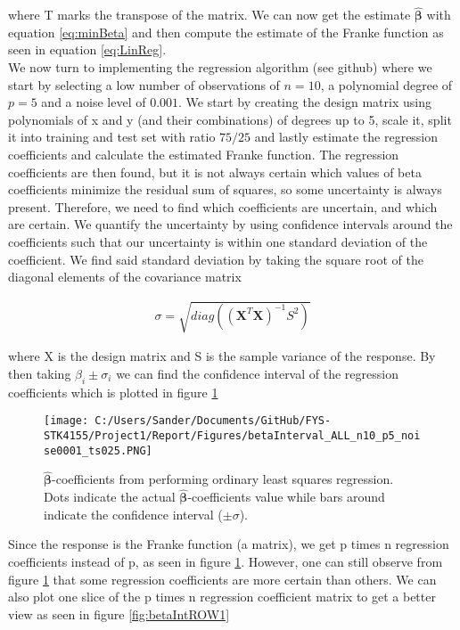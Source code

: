 \documentclass[12pt,a4paper]{article}
\begin{document}
\noindent where T marks the transpose of the matrix. We can now get the estimate $\hat{\boldsymbol{\beta}}$ with equation \ref{eq:minBeta} and then compute the estimate of the Franke function as seen in equation \ref{eq:LinReg}.
\\
We now turn to implementing the regression algorithm (see github) where we start by selecting a low number of observations of $n = 10$, a polynomial degree of $p = 5$ and a noise level of $0.001$. We start by creating the design matrix using polynomials of x and y (and their combinations) of degrees up to 5, scale it, split it into training and test set with ratio $75/25$ and lastly estimate the regression coefficients and calculate the estimated Franke function. The regression coefficients are then found, but it is not always certain which values of beta coefficients minimize the residual sum of squares, so some uncertainty is always present. Therefore, we need to find which coefficients are uncertain, and which are certain. We quantify the uncertainty by using confidence intervals around the coefficients such that our uncertainty is within one standard deviation of the coefficient. We find said standard deviation by taking the square root of the diagonal elements of the covariance matrix 

\begin{equation}\label{eq:diagCOV}
\begin{aligned}
\sigma = \sqrt{diag((\textbf{X}^T\textbf{X})^{-1}S^2)}
\end{aligned}
\end{equation}

\noindent where X is the design matrix and S is the sample variance of the response. By then taking $\beta_i \pm \sigma_i$ we can find the confidence interval of the regression coefficients which is plotted in figure \ref{fig:betaIntALL1}

\begin{figure}[H]
\centering
\texttt{[image: C:/Users/Sander/Documents/GitHub/FYS-STK4155/Project1/Report/Figures/betaInterval\_ALL\_n10\_p5\_noise0001\_ts025.PNG]}
\caption{\label{fig:betaIntALL1} $\hat{\boldsymbol{\beta}}$-coefficients from performing ordinary least squares regression. Dots indicate the actual $\hat{\boldsymbol{\beta}}$-coefficients value while bars around indicate the confidence interval ($\pm \sigma$).}
\end{figure}

\noindent Since the response is the Franke function (a matrix), we get p times n regression coefficients instead of p, as seen in figure \ref{fig:betaIntALL1}. However, one can still observe from figure \ref{fig:betaIntALL1} that some regression coefficients are more certain than others. We can also plot one slice of the p times n regression coefficient matrix to get a better view as seen in figure \ref{fig:betaIntROW1}
\end{document}
